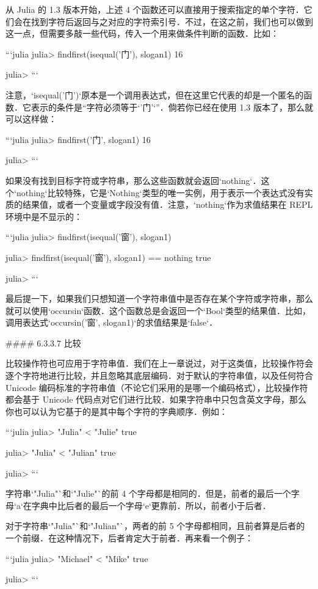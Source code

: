 从 Julia 的 1.3 版本开始，上述 4 个函数还可以直接用于搜索指定的单个字符．它们会在找到字符后返回与之对应的字符索引号．不过，在这之前，我们也可以做到这一点，但需要多敲一些代码，传入一个用来做条件判断的函数．比如：

```julia
julia> findfirst(isequal('门'),  slogan1) 
16

julia> 
```

注意，`isequal('门')`原本是一个调用表达式，但在这里它代表的却是一个匿名的函数．它表示的条件是“字符必须等于`'门'`”．倘若你已经在使用 1.3 版本了，那么就可以这样做：

```julia
julia> findfirst('门',  slogan1)
16

julia> 
```

如果没有找到目标字符或字符串，那么这些函数就会返回`nothing`．这个`nothing`比较特殊，它是`Nothing`类型的唯一实例，用于表示一个表达式没有实质的结果值，或者一个变量或字段没有值．注意，`nothing`作为求值结果在 REPL 环境中是不显示的：

```julia
julia> findfirst(isequal('窗'),  slogan1) 

julia> findfirst(isequal('窗'),  slogan1) == nothing
true

julia> 
```

最后提一下，如果我们只想知道一个字符串值中是否存在某个字符或字符串，那么就可以使用`occursin`函数．这个函数总是会返回一个`Bool`类型的结果值．比如，调用表达式`occursin('窗',  slogan1)`的求值结果是`false`．

#### 6.3.3.7 比较

比较操作符也可应用于字符串值．我们在上一章说过，对于这类值，比较操作符会逐个字符地进行比较，并且忽略其底层编码．对于默认的字符串值，以及任何符合 Unicode 编码标准的字符串值（不论它们采用的是哪一个编码格式），比较操作符都会基于 Unicode 代码点对它们进行比较．如果字符串中只包含英文字母，那么你也可以认为它基于的是其中每个字符的字典顺序．例如：

```julia
julia> "Julia" < "Julie"
true

julia> "Julia" < "Julian" 
true

julia> 
```

字符串`"Julia"`和`"Julie"`的前 4 个字母都是相同的．但是，前者的最后一个字母`a`在字典中比后者的最后一个字母`e`更靠前．所以，前者小于后者．

对于字符串`"Julia"`和`"Julian"`，两者的前 5 个字母都相同，且前者算是后者的一个前缀．在这种情况下，后者肯定大于前者．再来看一个例子：

```julia
julia> "Michael" < "Mike"
true

julia> 
```

